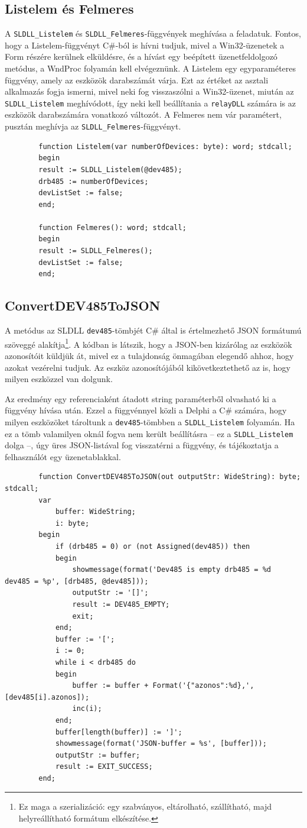 \documentclass[tocnopagenum]{thesis-ekf}
\begin{document}
	\subsection{Listelem és Felmeres} A \verb*|SLDLL_Listelem| és \verb*|SLDLL_Felmeres|-függvények meghívása a feladatuk. Fontos, hogy a Listelem-függvényt C\#-ból is hívni tudjuk, mivel a Win32-üzenetek a Form részére kerülnek elküldésre, és a hívást egy beépített üzenetfeldolgozó metódus, a WndProc folyamán kell elvégeznünk. A Listelem egy egyparaméteres függvény, amely az eszközök darabszámát várja. Ezt az értéket az asztali alkalmazás fogja ismerni, mivel neki fog visszaszólni a Win32-üzenet, miután az \verb*|SLDLL_Listelem| meghívódott, így neki kell beállítania a \verb*|relayDLL| számára is az eszközök darabszámára vonatkozó változót. A Felmeres nem vár paramétert, pusztán meghívja az \verb*|SLDLL_Felmeres|-függvényt.
	
	\begin{verbatim}
		function Listelem(var numberOfDevices: byte): word; stdcall;
		begin
		result := SLDLL_Listelem(@dev485);
		drb485 := numberOfDevices;
		devListSet := false;
		end;
		
		function Felmeres(): word; stdcall;
		begin
		result := SLDLL_Felmeres();
		devListSet := false;
		end;
	\end{verbatim}

	\subsection{ConvertDEV485ToJSON}
	A metódus az SLDLL \verb*|dev485|-tömbjét C\# által is értelmezhető JSON formátumú szöveggé alakítja\footnote{Ez maga a szerializáció: egy szabványos, eltárolható, szállítható, majd helyreállítható formátum elkészítése.}. A kódban is látszik, hogy a JSON-ben kizárólag az eszközök azonosítóit küldjük át, mivel ez a tulajdonság önmagában elegendő ahhoz, hogy azokat vezérelni tudjuk. Az eszköz azonosítójából kikövetkeztethető az is, hogy milyen eszközzel van dolgunk.
	
	Az eredmény egy referenciaként átadott string paraméterből olvasható ki a függvény hívása után. Ezzel a függvénnyel közli a Delphi a C\# számára, hogy milyen eszközöket tároltunk a \verb*|dev485|-tömbben a \verb*|SLDLL_Listelem| folyamán. Ha ez a tömb valamilyen oknál fogva nem került beállításra -- ez a \verb*|SLDLL_Listelem| dolga --, úgy üres JSON-listával fog visszatérni a függvény, és tájékoztatja a felhasználót egy üzenetablakkal.
	
	\begin{verbatim}
		function ConvertDEV485ToJSON(out outputStr: WideString): byte; stdcall;
		var
			buffer: WideString;
			i: byte;
		begin
			if (drb485 = 0) or (not Assigned(dev485)) then
			begin
				showmessage(format('Dev485 is empty drb485 = %d  dev485 = %p', [drb485, @dev485]));
				outputStr := '[]';
				result := DEV485_EMPTY;
				exit;
			end;
			buffer := '[';
			i := 0;
			while i < drb485 do
			begin
				buffer := buffer + Format('{"azonos":%d},', [dev485[i].azonos]);
				inc(i);
			end;
			buffer[length(buffer)] := ']'; 
			showmessage(format('JSON-buffer = %s', [buffer]));
			outputStr := buffer;
			result := EXIT_SUCCESS;
		end;
	\end{verbatim}
\end{document}
